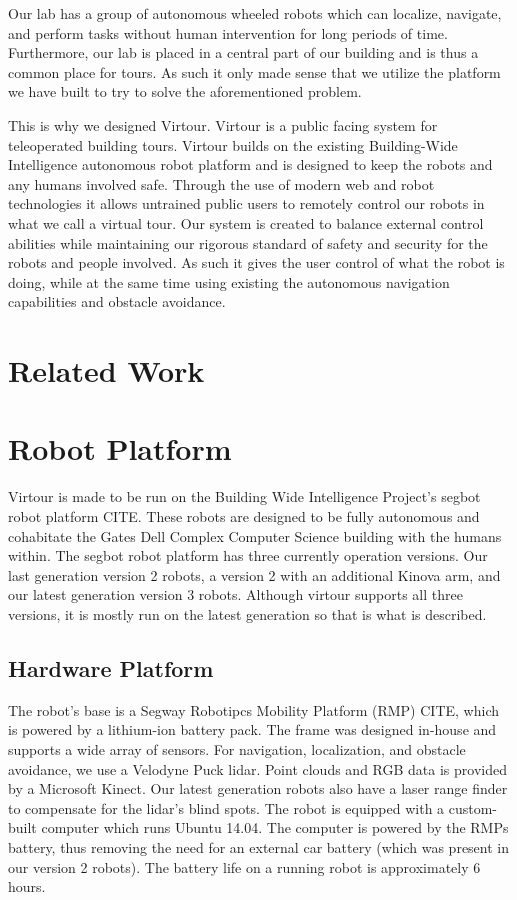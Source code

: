 \documentclass{sig-alternate-05-2015}
\begin{document}
Our lab has a group of autonomous wheeled robots which can localize, navigate,
and perform tasks without human intervention for long periods of time.
Furthermore, our lab is placed in a central part of our building and is thus a
common place for tours. As such it only made sense that we utilize the platform
we have built to try to solve the aforementioned problem.

This is why we designed Virtour. Virtour is a public facing system for
teleoperated building tours. Virtour builds on the existing Building-Wide
Intelligence autonomous robot platform and is designed to keep the robots and
any humans involved safe. Through the use of modern web and robot technologies
it allows untrained public users to remotely control our robots in what we call
a virtual tour. Our system is created to balance external control abilities
while maintaining our rigorous standard of safety and security for the robots
and people involved. As such it gives the user control of what the robot is
doing, while at the same time using existing the autonomous navigation
capabilities and obstacle avoidance.

\section{Related Work}

\section{Robot Platform}

Virtour is made to be run on the Building Wide Intelligence Project's segbot
robot platform {CITE}. These robots are designed to be fully autonomous and
cohabitate the Gates Dell Complex Computer Science building with the humans
within. The segbot robot platform has three currently operation versions. Our
last generation version 2 robots, a version 2 with an additional Kinova arm,
and our latest generation version 3 robots. Although virtour supports all three
versions, it is mostly run on the latest generation so that is what is
described.

\subsection{Hardware Platform}

The robot's base is a Segway Robotipcs Mobility Platform (RMP) {CITE}, which is
powered by a lithium-ion battery pack. The frame was designed in-house and
supports a wide array of sensors. For navigation, localization, and obstacle
avoidance, we use a Velodyne Puck lidar. Point clouds and RGB data is provided
by a Microsoft Kinect. Our latest generation robots also have a laser range
finder to compensate for the lidar's blind spots. The robot is equipped with a
custom-built computer which runs Ubuntu 14.04. The computer is powered by the
RMPs battery, thus removing the need for an external car battery (which was
present in our version 2 robots).  The battery life on a running robot is
approximately 6 hours.
\end{document}
